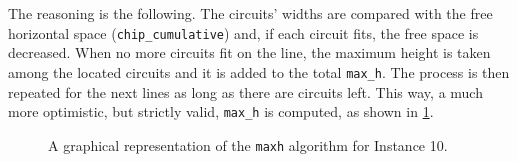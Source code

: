 \documentclass[a4paper, 12pt]{article}
\begin{document}
The reasoning is the following. The circuits' widths are compared with the free horizontal space (\verb+chip_cumulative+) and, if each circuit fits, the free space is decreased. When no more circuits fit on the line, the maximum height is taken among the located circuits and it is added to the total \verb|max_h|. The process is then repeated for the next lines as long as there are circuits left. This way, a much more optimistic, but strictly valid, \verb|max_h| is computed, as shown in \cref{fig:max_h}.

\begin{figure}
    \centering
    \caption[A graphical representation of the \texttt{maxh} algorithm.]{A graphical representation of the \texttt{maxh} algorithm for Instance 10.}
    \label{fig:max_h}
\end{figure}


\clearpage
\end{document}
